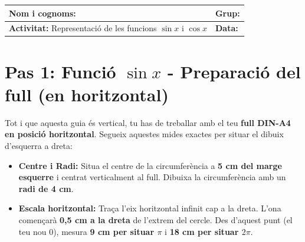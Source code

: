 \documentclass[12pt,a4paper]{article}
\begin{document}
\begingroup
\renewcommand{\arraystretch}{2.2}
\begin{tabularx}{\textwidth}{|X|p{4cm}|}
    \hline
    \textbf{Nom i cognoms:} & \textbf{Grup:} \\ \hline
    \textbf{Activitat:} Representació de les funcions $\sin{x}$ i $\cos{x}$  & \textbf{Data:} \\ \hline
\end{tabularx}
\endgroup

\vspace{0.8cm}

\section*{Pas 1: Funció $\sin{x}$ - Preparació del full (en horitzontal)}

Tot i que aquesta guia és vertical, tu has de treballar amb el teu \textbf{full DIN-A4 en posició horitzontal}. Segueix aquestes mides exactes per situar el dibuix d'esquerra a dreta:

\begin{itemize}
    \item \textbf{Centre i Radi:} Situa el centre de la circumferència a \textbf{5 cm del marge esquerre} i centrat verticalment al full. Dibuixa la circumferència amb un \textbf{radi de 4 cm}.
    \item \textbf{Escala horitzontal:} Traça l'eix horitzontal infinit cap a la dreta. L'ona començarà \textbf{0,5 cm a la dreta} de l'extrem del cercle. Des d'aquest punt (el teu nou $0$), mesura \textbf{9 cm per situar $\pi$} i \textbf{18 cm per situar $2\pi$}.
\end{itemize}

\begin{center}
\end{center}
\end{document}
